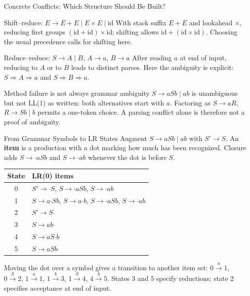 \documentclass[10pt]{beamer}
\begin{document}
\begin{frame}{Concrete Conflicts: Which Structure Should Be Built?}
  \small
  \begin{block}{Shift--reduce: $E\to E+E\mid E\times E\mid\mathrm{id}$}
    With stack suffix $E+E$ and lookahead $\times$, reducing first groups
    $(\mathrm{id}+\mathrm{id})\times\mathrm{id}$; shifting allows
    $\mathrm{id}+(\mathrm{id}\times\mathrm{id})$.
    Choosing the usual precedence calls for shifting here.
  \end{block}
  \pause
  \begin{block}{Reduce--reduce: $S\to A\mid B$, $A\to a$, $B\to a$}
    After reading $a$ at end of input, reducing to $A$ or to $B$ leads to
    distinct parses. Here the ambiguity is explicit:
    $S\Rightarrow A\Rightarrow a$ and $S\Rightarrow B\Rightarrow a$.
  \end{block}
  \pause
  \begin{alertblock}{Method failure is not always grammar ambiguity}
    $S\to aSb\mid ab$ is unambiguous but not LL(1) as written: both
    alternatives start with $a$. Factoring as $S\to aR$,
    $R\to Sb\mid b$ permits a one-token choice. A parsing conflict alone
    is therefore not a proof of ambiguity.
  \end{alertblock}
\end{frame}


\begin{frame}{From Grammar Symbols to LR States}
  \small
  Augment $S\to aSb\mid ab$ with $S'\to S$.
  An \textbf{item} is a production with a dot marking how much has been
  recognized. Closure adds $S\to\mathord{\cdot}aSb$ and
  $S\to\mathord{\cdot}ab$ whenever the dot is before $S$.
  \begin{center}
  \begin{tabular}{cL{7.9cm}}
    \toprule
    State & LR(0) items \\
     & $S'\to\mathord{\cdot}S$, $S\to\mathord{\cdot}aSb$,
        $S\to\mathord{\cdot}ab$ \\
    1 & $S\to a\mathord{\cdot}Sb$, $S\to a\mathord{\cdot}b$,
        $S\to\mathord{\cdot}aSb$, $S\to\mathord{\cdot}ab$ \\
    2 & $S'\to S\mathord{\cdot}$ \\
    3 & $S\to ab\mathord{\cdot}$ \\
    4 & $S\to aS\mathord{\cdot}b$ \\
    5 & $S\to aSb\mathord{\cdot}$ \\
    \bottomrule
  \end{tabular}
  \end{center}
  \pause
  Moving the dot over a symbol gives a transition to another item set:
  $0\xrightarrow{a}1$, $0\xrightarrow{S}2$,
  $1\xrightarrow{a}1$, $1\xrightarrow{b}3$,
  $1\xrightarrow{S}4$, $4\xrightarrow{b}5$.
  States 3 and 5 specify reductions; state 2 specifies acceptance at end of input.
\end{frame}
\end{document}
